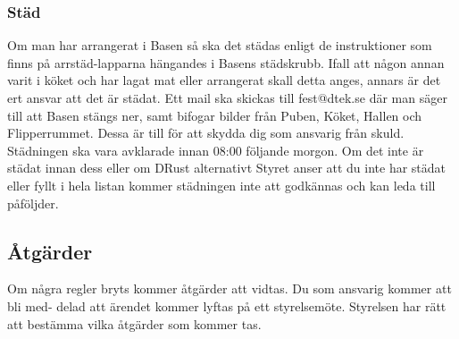 \subsubsection{Städ}
Om man har arrangerat i Basen så ska det städas enligt de instruktioner som finns på
arrstäd-lapparna hängandes i Basens städskrubb. Ifall att någon annan varit i köket och
har lagat mat eller arrangerat skall detta anges, annars är det ert ansvar att det är städat.
Ett mail ska skickas till fest@dtek.se där man säger till att Basen stängs ner, samt bifogar
bilder från Puben, Köket, Hallen och Flipperrummet. Dessa är till för att skydda dig som
ansvarig från skuld. Städningen ska vara avklarade innan 08:00 följande morgon. Om det
inte är städat innan dess eller om DRust alternativt Styret anser att du inte har städat
eller fyllt i hela listan kommer städningen inte att godkännas och kan leda till påföljder.

\subsection{Åtgärder}
Om några regler bryts kommer åtgärder att vidtas. Du som ansvarig kommer att bli med-
delad att ärendet kommer lyftas på ett styrelsemöte. Styrelsen har rätt att bestämma vilka
åtgärder som kommer tas.
